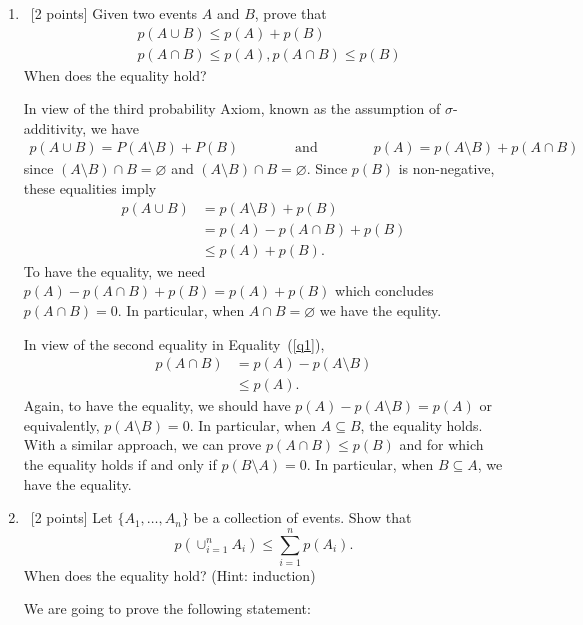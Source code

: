 \documentclass[12pt, fullpage,letterpaper]{article}
\def\blackblue{\color{black!40!blue}}
\begin{document}
%
\begin{enumerate}


\item~[2 points] Given two events $A$ and $B$, prove that 
\begin{align}
&p(A \cup B) \le p(A) + p(B) \nonumber \\
&p(A \cap B) \le p(A), p(A \cap B) \le p(B) \nonumber
\end{align}
When does the equality hold?

{\blackblue In view of the third probability Axiom, known as the assumption of $\sigma$-additivity, we have 
\begin{align}\label{q1}
p(A\cup B) = P(A\setminus B) +  P(B) \qquad\qquad \mbox{and}\qquad\qquad p(A) = p(A\setminus B) + p(A\cap B)
\end{align}
since  $(A\setminus B)\cap B = \varnothing$ and $(A\setminus B)\cap B=\varnothing$.  
Since $p(B)$ is non-negative, these equalities imply 
\begin{align*}
p(A\cup B) 
& =  p(A\setminus B) +  p(B)\\
& = p(A) - p(A\cap B)  + p(B)\\
& \leq  p(A) + p(B).
\end{align*}
To have the equality,  we need $p(A) - p(A\cap B)  + p(B) = p(A) + p(B)$ which concludes $p(A\cap B) = 0$. 
In particular, when $A\cap B = \varnothing$ we have the equlity. 


In view of the second equality in Equality~(\ref{q1}), 
\begin{align*}
p(A\cap B) &= p(A) - p(A\setminus B)\\
		 & \leq p(A).
\end{align*}
Again, to have the equality, we should have  $p(A) - p(A\setminus B) = p(A)$ or equivalently, $p(A\setminus B)= 0$. In particular, when $A\subseteq B$, the equality holds.
With a similar approach, we can prove $p(A\cap B)\leq p(B)$ and for which the equality holds if and only if $p(B\setminus A)= 0$. In particular, when $B\subseteq A$, we have the equality.
}
\item~[2 points] Let $\{A_1, \ldots, A_n\}$ be a collection of events. Show that
\[
p(\cup_{i=1}^n A_i) \le \sum_{i=1}^n p(A_i).
\]
When does the equality hold? (Hint: induction)\\
{\blackblue We are going to prove the following statement:

}
\end{enumerate}
\end{document}
